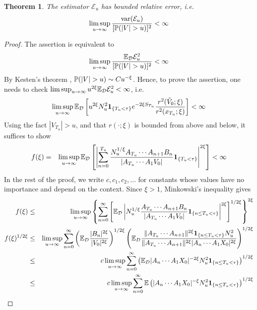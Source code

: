 \documentclass{article}
\newtheorem{theorem}{Theorem}
\theoremstyle{remark}
\begin{document}
\begin{theorem}
  The estimator $\mathcal E_u$ has bounded relative error, i.e.
  \begin{equation*}
    \limsup_{u \to \infty} {\var(\mathcal E_u) \over [\P(|V| > u)]^2} < \infty
  \end{equation*}
\end{theorem}
\begin{proof}
  The assertion is equivalent to
  \[
  \limsup_{u \to \infty} {\E_{\mathcal D} \mathcal E_u^2 \over [\P(|V|
    > u)]^2} < \infty
  \]
  By Kesten's theorem \cite{Kesten1973}, $\P(|V| > u) \sim C
  u^{-\xi}$. Hence, to prove the assertion, one needs to check
  $\limsup_{u \to \infty} u^{2\xi}\E_{\mathcal D} \mathcal E_u^2 <
  \infty$, i.e.
  \[
  \limsup_{u \to \infty} \E_{\mathcal D}  \left[u^{2\xi}
    N_u^2 \1{T_u < \tau} e^{-2\xi S_{T_u}} {r^2(\tilde V_0; \xi)
      \over r^2(x_{T_u}; \xi)}\right] < \infty
 \]
 Using the fact $|V_{T_u}| > u$, and that $r(\cdot; \xi)$ is bounded
 from above and below, it suffices to show
 \begin{eqnarray}
   f(\xi) &=& \limsup_{u \to \infty} \E_{\mathcal D} \left[
     \left|
       \sum_{n=0}^{T_u}
       \frac{
         N_u^{1/\xi} A_{T_u} \cdots A_{n+1} B_n 
       }{
         |A_{T_u} \cdots A_1 V_0|
       }
       \1{T_u < \tau}
     \right|^{2 \xi}
   \right] < \infty \label{eq:efficiency_target}
 \end{eqnarray}
  In the rest of the proof, we write $c, c_1, c_2, \dots$ for
  constants whose values have no importance and depend on the
  context. Since $\xi > 1$, Minkowski's inequality gives
    \begin{eqnarray}
      f(\xi) &\leq& \limsup_{u \to \infty}
      \left\{
        \sum_{n=0}^{\infty}
        \left[
          \E_{\mathcal D} \left|
            N_u^{1/\xi}
            \frac{
              A_{T_u} \cdots A_{n+1} B_n 
            }{
              |A_{T_u} \cdots A_1 V_0|
            }
            \1{n \leq T_u < \tau}
          \right|^{2 \xi}
        \right]^{1/2\xi}
      \right\}^{2\xi} \nonumber \\
      f(\xi)^{1/2\xi}
      &\leq& \limsup_{u \to \infty}
      \sum_{n=0}^\infty
      \left(
        \E_D {
          |B_n|^{2\xi}
          \over
          |V_0|^{2\xi}
        }
      \right)^{1/2\xi}
      \left(
        \E_D {
          \|A_{T_u} \cdots A_{n+1}\|^{2\xi}
          \1{n \leq T_u < \tau}
          N_u^2
          \over
          \|A_{T_u} \cdots A_{n+1}\|^{2\xi}
          |A_n \cdots A_1 X_0|^{2\xi}
        }
      \right)^{1/2\xi} \\
      &\leq&
      c \limsup_{u \to \infty}
      \sum_{n=0}^\infty
      \left(
        \E_D |A_n \cdots A_1 X_0|^{-2\xi}
        N_u^2
        \1{n \leq T_u < \tau}        
      \right)^{1/2\xi} \\
      &\leq&
      c \limsup_{u \to \infty}
      \sum_{n=0}^\infty
      \E \left(
        |A_n \cdots A_1 X_0|^{-\xi}
        N_u^2
        \1{n \leq T_u < \tau}        
      \right)^{1/2\xi} \label{eq:split_point}
    \end{eqnarray}
    

\end{proof}
\end{document}
